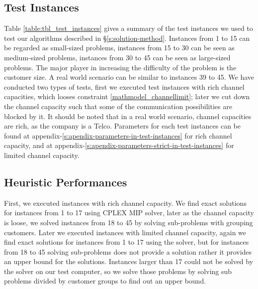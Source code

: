 \documentclass[11pt]{article}
\begin{document}
\subsection{Test Instances} \label{test_cases}
Table \ref{table:tbl_test_instances} gives a summary of the test instances we used to test our algorithms described in \S \ref{s:solution-method}. Instances from 1 to 15 can be regarded as small-sized problems, instances from 15 to 30 can be seen as medium-sized problems, instances from 30 to 45 can be seen as large-sized problems. The major player in increasing the difficulty of the problem is the customer size. A real world scenario can be similar to instances 39 to 45. We have conducted two types of tests, first we executed test instances with rich channel capacities, which looses constraint \eqref{mathmodel_channellimit}; later we cut down the channel capacity such that some of the communication possibilities are blocked by it. It should be noted that in a real world scenario, channel capacities are rich, as the company is a Telco. Parameters for each test instances can be found at appendix-\ref{s:apendix-parameters-in-test-instances} for rich channel capacity, and at appendix-\ref{s:apendix-parameters-strict-in-test-instances} for limited channel capacity.\\

\begin{table}[htb!]
\end{table}
\clearpage

\subsection{Heuristic Performances} \label{s:test_evaluation}
First, we executed instances with rich channel capacity. We find exact solutions for instances from 1 to 17 using CPLEX MIP solver, later as the channel capacity is loose, we solved instances from 18 to 45 by solving sub-problems with grouping customers. Later we executed instances with limited channel capacity, again we find exact solutions for instances from 1 to 17 using the solver, but for instances from 18 to 45 solving sub-problems does not provide a solution rather it provides an upper bound for the solutions. Instances larger than 17 could not be solved by the solver on our test computer, so we solve those problems by solving sub problems divided by customer groups to find out an upper bound.
\end{document}
